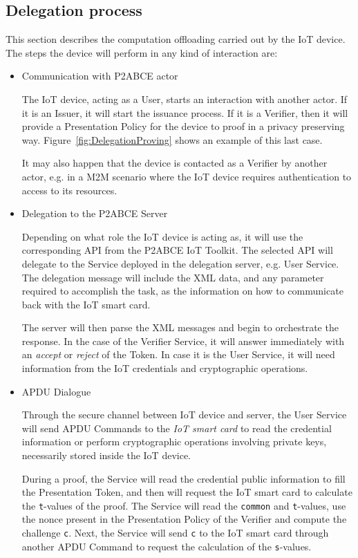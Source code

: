 \subsection{Delegation process}

This section describes the computation offloading carried out by the IoT device. The steps the device will perform in any kind of interaction are:

\begin{itemize}
	\item Communication with P2ABCE actor
	
	The IoT device, acting as a User, starts an interaction with another actor. If it is an Issuer, it will start the issuance process. If it is a Verifier, then it will provide a Presentation Policy for the device to proof in a privacy preserving way. Figure~\ref{fig:DelegationProving} shows an example of this last case.
	
	It may also happen that the device is contacted as a Verifier by another actor, e.g. in a M2M scenario where the IoT device requires authentication to access to its resources.
	
	\item Delegation to the P2ABCE Server
	
	Depending on what role the IoT device is acting as, it will use the corresponding API from the P2ABCE IoT Toolkit. The selected API will delegate to the Service deployed in the delegation server, e.g. User Service. The delegation message will include the XML data, and any parameter required to accomplish the task, as the information on how to communicate back with the IoT smart card.
	
	The server will then parse the XML messages and begin to orchestrate the response. In the case of the Verifier Service, it will answer immediately with an \textit{accept} or \textit{reject} of the Token. In case it is the User Service, it will need information from the IoT credentials and cryptographic operations.
	
	\item APDU Dialogue
	
	Through the secure channel between IoT device and server, the User Service will send APDU Commands to the  \textit{IoT smart card} to read the credential information or perform cryptographic operations involving private keys, necessarily stored inside the IoT device.
	
	During a proof, the Service will read the credential public information to fill the Presentation Token, and then will request the IoT smart card to calculate the \texttt{t}-values of the proof. The Service will read the \texttt{common} and \texttt{t}-values, use the nonce present in the Presentation Policy of the Verifier and compute the challenge \texttt{c}. Next, the Service will send \texttt{c} to the IoT smart card through another APDU Command to request the calculation of the \texttt{s}-values.
	

\end{itemize}
